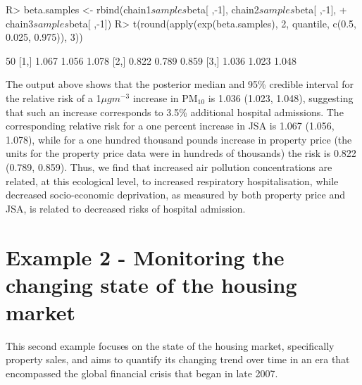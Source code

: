 \documentclass[article, nojss]{jss}
\begin{document}
\begin{CodeInput}
R>  beta.samples <- rbind(chain1$samples$beta[ ,-1], chain2$samples$beta[ ,-1], 
+           chain3$samples$beta[ ,-1])
R>  t(round(apply(exp(beta.samples), 2, quantile, c(0.5, 0.025, 0.975)), 3))
\end{CodeInput}


\begin{CodeOutput}
      50%
[1,] 1.067 1.056 1.078
[2,] 0.822 0.789 0.859
[3,] 1.036 1.023 1.048
\end{CodeOutput}


The output above shows that the posterior median and 95\% credible interval for the relative risk of a 1$\mu gm^{-3}$  increase in PM$_{10}$ is 1.036 (1.023, 1.048), suggesting that such an increase corresponds to 3.5\% additional hospital admissions. The corresponding relative risk for a one percent increase in JSA is 1.067 (1.056, 1.078), while for a one hundred thousand pounds increase in  property price (the units for the  property price data were in hundreds of thousands) the risk is 0.822 (0.789, 0.859). Thus, we find that increased air pollution concentrations are related, at this ecological level, to increased respiratory hospitalisation, while decreased socio-economic deprivation, as measured by both property price and JSA, is related to decreased risks of hospital admission.





\section{Example 2 - Monitoring the changing state of the housing market}\label{section5}
This second example focuses on the state of the housing market, specifically property sales, and aims to quantify its changing trend over time in an era that encompassed the global financial crisis that began in late 2007. 
\end{document}
